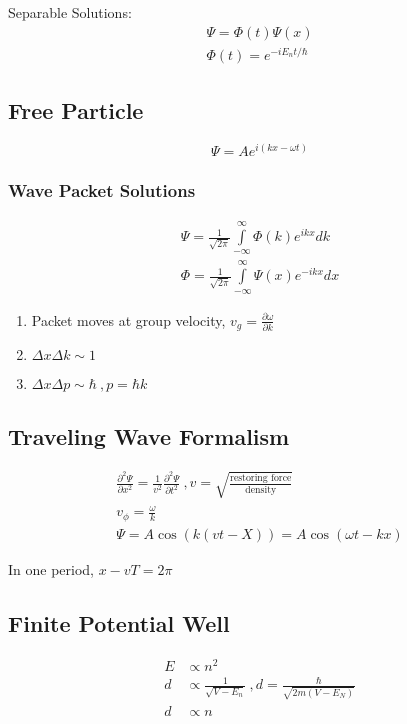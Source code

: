 \documentclass[10pt,a4paper]{article}
\begin{document}
Separable Solutions: 
\begin{align}
    \Psi = \Phi(t)\Psi(x)\\
    \Phi(t) = e^{-iE_nt/\hbar}
\end{align}

\subsection{Free Particle}
\begin{equation}
 \Psi = Ae^{i(kx-\omega t)} 
\end{equation}

\subsubsection{Wave Packet Solutions}
\begin{align}
 \Psi =  \frac{1}{\sqrt{2\pi}} \int\limits_{-\infty}^\infty \Phi(k) e^{ikx}dk\\
 \Phi =  \frac{1}{\sqrt{2\pi}} \int\limits_{-\infty}^\infty \Psi(x) e^{-ikx}dx
\end{align}

\begin{enumerate}
    \item Packet moves at group velocity, $v_g = \frac{\partial \omega}{\partial k}$ 
    \item $\Delta x\Delta k \sim 1$
    \item $\Delta x \Delta p \sim \hbar~, p = \hbar k$
\end{enumerate}

\subsection{Traveling Wave Formalism}
\begin{align}
    \frac{\partial^2 \Psi}{\partial x^2} = \frac{1}{v^2} \frac{\partial ^2 \Psi}{\partial t^2}~,v=\sqrt{\frac{\textrm{restoring force}}{\textrm{density}}}\\
    v_\phi = \frac{\omega}{k}\\
    \Psi = A\cos(k(vt-X)) = A \cos(\omega t - kx)
\end{align}

In one period, $x-vT = 2\pi$

\subsection{Finite Potential Well}
\begin{align}
 E &\propto n^2\\ 
 d &\propto \frac{1}{\sqrt{V-E_n}}~,d=\frac{\hbar}{\sqrt{2m(V-E_N)}}\\
 d &\propto n
\end{align}
\end{document}
